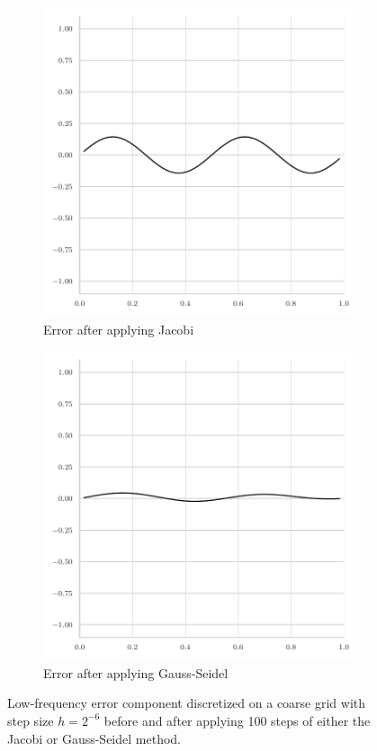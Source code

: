 \begin{figure}
\begin{subfigure}[b]{0.32\textwidth}
	\includegraphics[width=\textwidth]{figures/error_plots//final_error_jacobi_4pi_coarse.pdf}
	\caption{Error after applying Jacobi}
\end{subfigure}
	\hfill
	\begin{subfigure}[b]{0.32\textwidth}
		\centering
		\includegraphics[width=\textwidth]{figures/error_plots//final_error_gauss_seidel_4pi_coarse.pdf}
		\caption{Error after applying Gauss-Seidel}
	\end{subfigure}
	\caption{Low-frequency error component discretized on a coarse grid with step size $h = 2^{-6}$ before and after applying 100 steps of either the Jacobi or Gauss-Seidel method.}
	\label{fig:low-frequency-error-component-coarse}
\end{figure}
